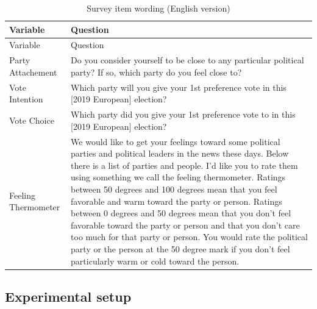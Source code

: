 \documentclass[
  12pt,
  a4paper,
  DIV=11,
  numbers=noendperiod]{scrartcl}
\begin{document}
\begin{longtable}[]{@{}
  >{\raggedright\arraybackslash}p{}
  >{\raggedright\arraybackslash}p{}@{}}
\caption{Survey item wording (English
version)}\label{tbl-survey-items}\tabularnewline
\toprule\noalign{}
\begin{minipage}[b]{\linewidth}\raggedright
Variable
\end{minipage} & \begin{minipage}[b]{\linewidth}\raggedright
Question
\end{minipage} \\
\midrule\noalign{}
\endfirsthead
\toprule\noalign{}
\begin{minipage}[b]{\linewidth}\raggedright
Variable
\end{minipage} & \begin{minipage}[b]{\linewidth}\raggedright
Question
\end{minipage} \\
\midrule\noalign{}
\endhead
\bottomrule\noalign{}
\endlastfoot
Party Attachement & Do you consider yourself to be close to any
particular political party? If so, which party do you feel close to? \\
Vote Intention & Which party will you give your 1st preference vote in
this {[}2019 European{]} election? \\
Vote Choice & Which party did you give your 1st preference vote to in
this {[}2019 European{]} election? \\
Feeling Thermometer & We would like to get your feelings toward some
political parties and political leaders in the news these days. Below
there is a list of parties and people. I'd like you to rate them using
something we call the feeling thermometer. Ratings between 50 degrees
and 100 degrees mean that you feel favorable and warm toward the party
or person. Ratings between 0 degrees and 50 degrees mean that you don't
feel favorable toward the party or person and that you don't care too
much for that party or person. You would rate the political party or the
person at the 50 degree mark if you don't feel particularly warm or cold
toward the person. \\
\end{longtable}

\subsection{Experimental setup}\label{experimental-setup}
\end{document}
